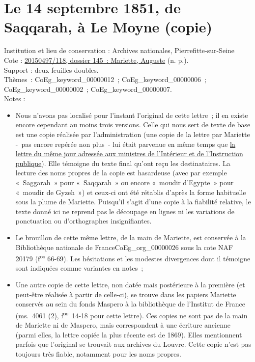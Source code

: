 \documentclass{book}
\begin{document}
\section*{Le 14 septembre 1851, de Saqqarah, à Le Moyne (copie)} 
{\footnotesize
\noindent Institution et lieu de conservation : Archives nationales, Pierrefitte-sur-Seine\\
Cote : \hyperlink{CoEg_Mariette_ms_001}{20150497/118, dossier 145~: Mariette, Auguste} (n. p.).\\
Support : deux feuilles doubles.\\
Thèmes~: \gls{CoEg_keyword_00000012}~; \gls{CoEg_keyword_00000006}~; \gls{CoEg_keyword_00000002}~;  \gls{CoEg_keyword_00000007}.\\
Notes :  \begin{itemize} \item Nous n’avons pas localisé pour l’instant l’original de cette lettre~; il en existe encore cependant au moins trois versions. Celle qui nous sert de texte de base est une copie réalisée par l’administration (une copie de la lettre par Mariette -~pas encore repérée non plus~- lui était parvenue en même temps que \hyperlink{CoEg_Mariette_1851-09-14b}{la lettre du même jour adressée aux ministres de l’Intérieur et de l’Instruction publique}). Elle témoigne du texte final qu’ont reçu les destinataires. La lecture des noms propres de la copie est hasardeuse (avec par exemple «~Saggarah~» pour «~Saqqarah~» ou encore «~moudir d’Egypte~» pour «~moudir de Gyzeh~») et ceux-ci ont été rétablis d'après la forme habituelle sous la plume de Mariette. Puisqu’il s’agit d’une copie à la fiabilité relative, le texte donné ici ne reprend pas le découpage en lignes ni les variations de ponctuation ou d’orthographes insignifiantes.
\item Le brouillon de cette même lettre, de la main de Mariette, est conservée à la Bibliothèque nationale de France\gls{CoEg_org_00000026} sous la cote NAF 20179 (f\textsuperscript{os} 66-69). Les hésitations et les modestes divergences dont il témoigne sont indiquées comme variantes en notes~;
\item Une autre copie de cette lettre, non datée mais postérieure à la première (et peut-être réalisée à partir de celle-ci), se trouve dans les papiers Mariette conservés au sein du fonds Maspero à la bibliothèque de l’Institut de France (ms.~4061 (2), f\textsuperscript{os}~14-18 pour cette lettre). Ces copies ne sont pas de la main de Mariette ni de Maspero, mais correspondent à une écriture ancienne (parmi elles, la lettre copiée la plus récente est de 1869). Elles mentionnent parfois que l’original se trouvait aux archives du Louvre. Cette copie n’est pas toujours très fiable, notamment pour les noms propres. \end{itemize}            }
\end{document}

